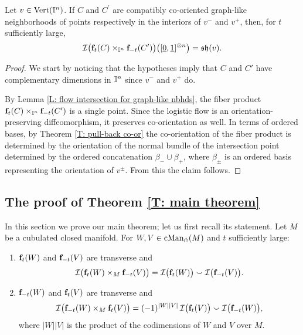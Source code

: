 \begin{lemma}\label{L: sign for graph-like nbhds intersection}
	Let $v \in {\rm Vert}(\mathbb{I}^n)$.
	If $C$ and $C^\prime$ are compatibly co-oriented graph-like neighborhoods of points respectively in the interiors of $v^-$ and $v^+$, then, for $t$ sufficiently large,
	\begin{equation}
		\label{E: sign flow intersection graph-like 1}
		\mathcal{I} \big( \mathbf{f}_t(C) \times_{\mathbb{I}^n} \mathbf{f}_{-t}(C^\prime) \big)
		\big( [\underline{0}, \underline{1}]^{\otimes n} \big) = \mathfrak{sh}(v). \\
	\end{equation}
\end{lemma}

\begin{proof}
	We start by noticing that the hypotheses imply that $C$ and $C'$ have complementary dimensions in $\mathbb{I}^n$ since $v^-$ and $v^+$ do.

	By Lemma \ref{L: flow intersection for graph-like nbhds}, the fiber product $\mathbf{f}_t(C) \times_{\mathbb{I}^n} \mathbf{f}_{-t}(C^\prime)$ is a single point.
	Since the logistic flow is an orientation-preserving diffeomorphism, it preserves co-orientation as well.
	In terms of ordered bases, by Theorem \ref{T: pull-back co-or} the co-orientation of the fiber product is determined by the orientation of the normal bundle of the intersection point determined by the ordered concatenation $\beta_- \cup \beta_+$, where $\beta_\pm$ is an ordered basis representing the orientation of $v^\pm$. From this the claim follows.
\end{proof}

\subsection{The proof of Theorem \ref{T: main theorem}}

In this section we prove our main theorem; let us first recall its statement.
Let $M$ be a cubulated closed manifold.
For $W, V \in \mathrm{cMan}_\pitchfork(M)$ and $t$ sufficiently large:
\begin{enumerate}
	\item $\mathbf{f}_t(W)$ and $\mathbf{f}_{-t}(V)$ are transverse and
	\begin{equation*}
		\mathcal{I} \big( \mathbf{f}_t(W) \times_M \mathbf{f}_{-t}(V) \big) =
		\mathcal{I} \big( \mathbf{f}_t(W) \big) \smallsmile \mathcal{I} \big( \mathbf{f}_{-t}(V) \big).
	\end{equation*}
	\item $\mathbf{f}_{-t}(W)$ and $\mathbf{f}_t(V)$ are transverse and
	\begin{equation*}
		\mathcal{I} \big( \mathbf{f}_{-t}(W) \times_M \mathbf{f}_t(V) \big) =
		(-1)^{|W||V|} \, \mathcal{I} \big( \mathbf{f}_t(V) \big) \smallsmile \mathcal{I} \big( \mathbf{f}_{-t}(W) \big),
	\end{equation*}
	where $|W||V|$ is the product of the codimensions of $W$ and $V$ over $M$.
\end{enumerate}

